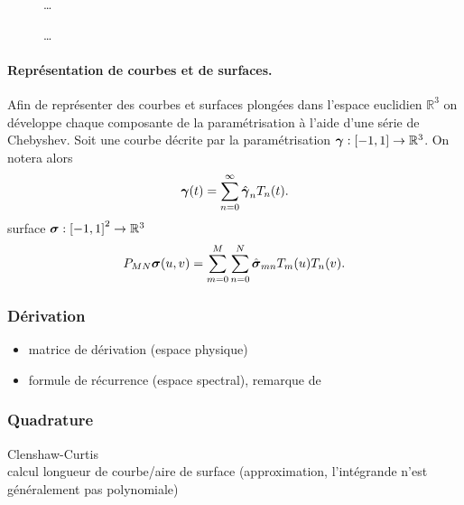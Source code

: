\begin{figure}[!htp]
\centering%
%
\caption{\ldots}%
\end{figure}

\begin{figure}[!htp]
\centering%
%
\caption{\ldots}%
\end{figure}

\paragraph{Représentation de courbes et de surfaces.}
Afin de représenter des courbes et surfaces plongées dans l'espace euclidien $\mathbb{R}^3$ on développe chaque composante de la paramétrisation à l'aide d'une série de Chebyshev.
Soit une courbe décrite par la paramétrisation $\boldsymbol{\gamma} : \left[ -1, 1 \right] \to \mathbb{R}^3$. On notera alors
\begin{equation}
	\boldsymbol{\gamma}(t) = \sum_{n=0}^{\infty} \hat{\boldsymbol{\gamma}}_{n} T_n(t).
\end{equation}
surface $\boldsymbol{\sigma} : \left[ -1, 1 \right]^2 \to \mathbb{R}^3$
\begin{equation}
	P_{MN}{\boldsymbol{\sigma}}(u,v) = \sum_{m=0}^{M} \sum_{n=0}^{N} \hat{\boldsymbol{\sigma}}_{mn} T_m(u) T_n(v).
\end{equation}


\subsubsection{Dérivation}
\begin{itemize}
	\item matrice de dérivation (espace physique)
	\item formule de récurrence (espace spectral), remarque de \cite[Section~2.3, p~.94]{wengle1978}%
\end{itemize}

\subsubsection{Quadrature}
Clenshaw-Curtis\\
calcul longueur de courbe/aire de surface (approximation, l'intégrande n'est généralement pas polynomiale)




